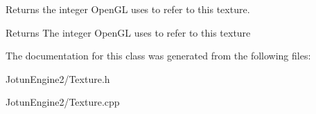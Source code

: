 Returns the integer Open\-G\-L uses to refer to this texture. 

\begin{DoxyReturn}{Returns}
The integer Open\-G\-L uses to refer to this texture 
\end{DoxyReturn}


The documentation for this class was generated from the following files\-:\begin{DoxyCompactItemize}
\item 
Jotun\-Engine2/Texture.\-h\item 
Jotun\-Engine2/Texture.\-cpp\end{DoxyCompactItemize}
